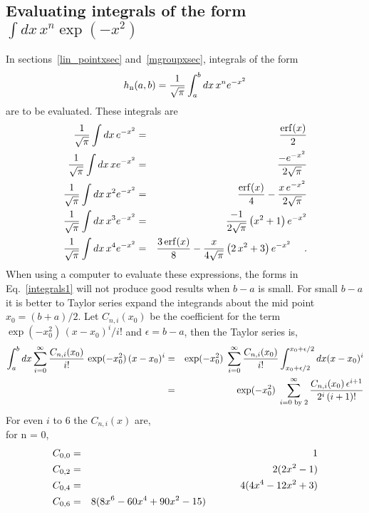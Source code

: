 \documentclass[11pt,twoside]{article}
\begin{document}
\subsection{Evaluating integrals of the form $\int dx \, x^n \exp(-x^2)$}
In sections~\ref{lin_pointxsec} and~\ref{mgroupxsec}, integrals of the form
\begin{equation}
	h_{\rm n}(a, b) = { 1 \over \sqrt{\pi} } \int_a^b dx \, x^n e^{-x^2}
\end{equation}
are to be evaluated. These integrals are
\begin{eqnarray}  \label{integrals1}
	{ 1 \over \sqrt{\pi} } \int dx \,     e^{-x^2} & = & { {\rm erf}(x) \over 2 }   \nonumber \\
	{ 1 \over \sqrt{\pi} } \int dx \, x   e^{-x^2} & = & { -e^{-x^2} \over 2 \sqrt{\pi} } \nonumber \\
	{ 1 \over \sqrt{\pi} } \int dx \, x^2 e^{-x^2} & = & { {\rm erf}(x) \over 4 } - 
		{ x \, e^{-x^2} \over 2 \sqrt{\pi} } \nonumber \\
	{ 1 \over \sqrt{\pi} } \int dx \, x^3 e^{-x^2} & = & { -1 \over 2 \sqrt{\pi} } \left( x^2 + 1 \right) e^{-x^2} \nonumber \\
	{ 1 \over \sqrt{\pi} } \int dx \, x^4 e^{-x^2} & = & { 3 \, {\rm erf}(x) \over 8 } - { x \over 4 \sqrt{\pi} } 
		\left( 2 \, x^2 + 3 \right) e^{-x^2} \ \ \ \ .
\end{eqnarray}
When using a computer to evaluate these expressions, the forms in Eq.~\ref{integrals1} will not produce
good results when $b - a$ is small. For small $b - a$ it is better to Taylor series expand the integrands
about the mid point $x_0 = ( b + a ) / 2$. Let $C_{n,i}(x_0)$ be the coefficient for the term
$\exp(-x_0^2) \, ( x - x_0 )^i / i!$ and $\epsilon = b - a$, then the Taylor series is,
\begin{eqnarray}
	\int_a^b dx \sum_{i=0}^{\infty} { C_{n,i}(x_0) \over i! } \, \exp(-x_0^2) \, ( x - x_0 )^i
		& = & \exp(-x_0^2) \; \sum_{i=0}^{\infty} { C_{n,i}(x_0) \over i! } 
		\int_{x_0 + \epsilon / 2}^{x_0 + \epsilon / 2} dx ( x - x_0 )^i \nonumber \\
		& = & \exp(-x_0^2) \; \sum_{i=0 {\rm\;by\;2}}^{\infty} { C_{n,i}(x_0) \, \epsilon^{i+1} \over 2^i \, (i + 1)! } 
\end{eqnarray}
For even $i$ to 6 the $C_{n,i}(x)$ are, \\
for n = 0,
\begin{eqnarray}  \label{C0is}
	C_{0,0} & = & 1 \nonumber \\
	C_{0,2} & = & 2 ( 2 x^2 - 1 ) \nonumber \\
	C_{0,4} & = & 4 ( 4 x^4 - 12 x^2 + 3 ) \nonumber \\
	C_{0,6} & = & 8 ( 8 x^6 - 60 x^4 + 90 x^2 - 15 )                \hspace{1.55in}
\end{eqnarray}
\end{document}
